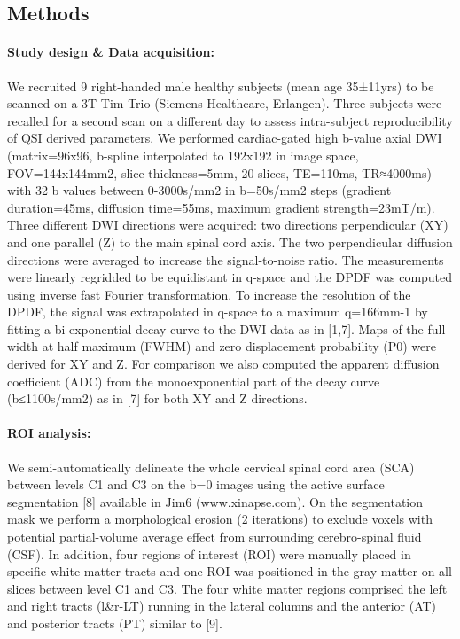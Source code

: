 \subsection*{Methods}
\paragraph{Study design \& Data acquisition:} We recruited 9 right-handed male healthy subjects (mean age 35±11yrs) to be scanned on a 3T Tim Trio (Siemens Healthcare, Erlangen). Three subjects were recalled for a second scan on a different day to assess intra-subject reproducibility of QSI derived parameters. We performed cardiac-gated high b-value axial DWI (matrix=96x96, b-spline interpolated to 192x192 in image space, FOV=144x144mm2, slice thickness=5mm, 20 slices, TE=110ms, TR≈4000ms) with 32 b values between 0-3000s/mm2 in b=50s/mm2 steps (gradient duration=45ms, diffusion time=55ms, maximum gradient strength=23mT/m). Three different DWI directions were acquired: two directions perpendicular (XY) and one parallel (Z) to the main spinal cord axis. The two perpendicular diffusion directions were averaged to increase the signal-to-noise ratio. The measurements were linearly regridded to be equidistant in q-space and the DPDF was computed using inverse fast Fourier transformation. To increase the resolution of the DPDF, the signal was extrapolated in q-space to a maximum q=166mm-1 by fitting a bi-exponential decay curve to the DWI data as in [1,7]. Maps of the full width at half maximum (FWHM) and zero displacement probability (P0) were derived for XY and Z. For comparison we also computed the apparent diffusion coefficient (ADC) from the monoexponential part of the decay curve (b≤1100s/mm2) as in [7] for both XY and Z directions.    
\paragraph{ROI analysis:} We semi-automatically delineate the whole cervical spinal cord area (SCA) between levels C1 and C3 on the b=0 images using the active surface segmentation [8] available in Jim6 (www.xinapse.com). On the segmentation mask we perform a morphological erosion (2 iterations) to exclude voxels with potential partial-volume average effect from surrounding cerebro-spinal fluid (CSF). In addition, four regions of interest (ROI) were manually placed in specific white matter tracts and one ROI was positioned in the gray matter on all slices between level C1 and C3. The four white matter regions comprised the left and right tracts (l\&r-LT) running in the lateral columns and the anterior (AT) and posterior tracts (PT) similar to [9]. 
